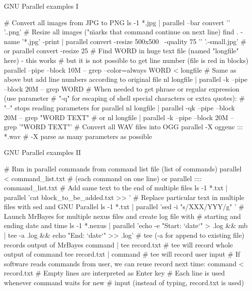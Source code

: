 \documentclass[compress, ucs, xelatex, 11pt, xcolor=svgnames,
  hyperref={
    bookmarks=true,
    unicode=true,
    colorlinks=true,
    pdftitle={Linux, command line and MetaCentrum},
    plainpages=false,
    pdfauthor={Vojtech Zeisek},
    pdfsubject={Course about use of Linux command line, writing shell scripts and using MetaCentrum of CESNET},
    pdfcreator={XeLaTeX},
    pdfkeywords={Linux, GNU, BASH, shell, command line, MetaCentrum},
    linkcolor=DarkRed,
    anchorcolor=DarkBlue,
    citecolor=Indigo,
    filecolor=NavyBlue,
    menucolor=DarkMagenta,
    urlcolor=DarkBlue,
    pdftex},
  url={hyphens, lowtilde} %
  ]{beamer}
\begin{document}
\begin{frame}[fragile]{GNU Parallel examples I}
  \begin{bashcode}
    # Convert all images from JPG to PNG
    ls -1 *.jpg | parallel --bar convert '{}' '{.}.png'
    # Resize all images ("\" marks that command continue on next line)
    find . -name '*.jpg' -print | parallel convert -resize 500x500 \
      -quality 75 '{}' '{.}-small.jpg' # or
    parallel convert -resize 25%
    # Find WORD in huge text file (named "longfile" here) - this works
    # but it is not possible to get line number (file is red in blocks)
    parallel --pipe --block 10M -- grep --color=always WORD < longfile
    # Same as above but add line numbers according to original file
    nl longfile | parallel -k --pipe --block 20M -- grep WORD
    # When needed to get phrase or regular expression (use parameter
    # "-q" for escaping of shell special characters or extra quotes):
    # "--" stops reading parameters for parallel
    nl longfile | parallel -qk --pipe --block 20M -- grep "WORD TEXT" # or
    nl longfile | parallel -k --pipe --block 20M -- grep '"WORD TEXT"'
    # Convert all WAV files into OGG
    parallel -X oggenc ::: *.wav # -X parse as many parameters as possible
  \end{bashcode}
\end{frame}

\begin{frame}[fragile]{GNU Parallel examples II}
  \begin{bashcode}
    # Run in parallel commands from command list file (list of commands)
    parallel < command_list.txt # (each command on one line) or
    parallel :::: command_list.txt
    # Add same text to the end of multiple files
    ls -1 *.txt | parallel 'cat block_to_be_added.txt >> {}'
    # Replace particular text in multiple files with sed and GNU Parallel
    ls -1 *.txt | parallel 'sed -i "s/XXX/YYY/g" {}'
    # Launch MrBayes for multiple nexus files and create log file with
    # starting and ending date and time
    ls -1 *.nexus | parallel 'echo -e "Start: `date`\n" > {}.log && mb {} |
      tee -a {}.log && echo "End: `date`" >> {}.log'
    # tee (-a for append to existing file) records output of MrBayes
    command | tee record.txt # tee will record whole output of command
    tee record.txt | command # tee will record user input
    # If software reads commands from user, we can reuse record next time:
    command < record.txt # Empty lines are interpreted as Enter key
                         # Each line is used whenever command waits for new
                         # input (instead of typing, record.txt is used)
  \end{bashcode}
\end{frame}
\end{document}
